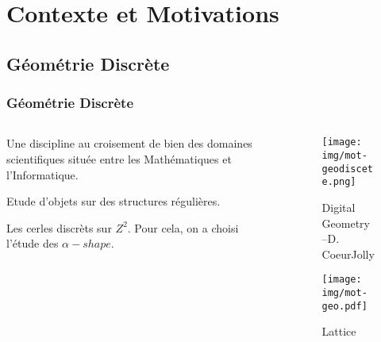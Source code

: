 \documentclass{beamer}
\begin{document}
\section{Contexte et Motivations}

\subsection{Géométrie Discrète}
\begin{frame}
  \frametitle{Géométrie Discrète}

  \begin{columns}[t]
    \begin{column}{6cm}
      \begin{block}{}
        Une discipline au croisement de bien des domaines scientifiques située entre les Mathématiques et l'Informatique.
      \end{block}
      \begin{center}  
        \alert{Etude d'objets sur des structures régulières.}
      \end{center}
      \begin{block}{}
        Les \alert{cerles discrèts} sur $Z^2$. Pour cela, on a choisi l'étude des \alert{$\alpha-shape$}.
      \end{block}
    \end{column}

    \begin{column}{4cm}
      \begin{figure}[h!]
      \centering
         \texttt{[image: img/mot-geodiscete.png]}
      \caption{Digital Geometry --D. CoeurJolly}
    \end{figure}
      
    \begin{figure}[h!]
      \centering
        \texttt{[image: img/mot-geo.pdf]}
        \caption{Lattice}
      \end{figure}
    \end{column}
  \end{columns}  
\end{frame}
\end{document}
